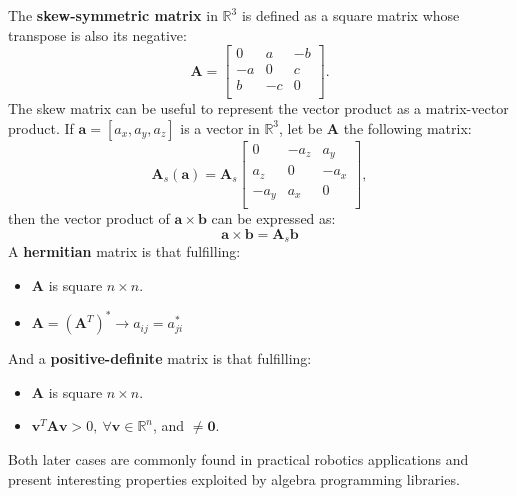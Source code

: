 The \textbf{skew-symmetric matrix} in $\mathbb{R}^3$ is defined as a square matrix whose transpose is also its negative:
\begin{equation}
\mathbf{A} = 
\left[
\begin{array}{ccc}
  0 & a & -b\\
  -a & 0 & c\\
  b & -c & 0\\
\end{array}
\right].
\end{equation}
The skew matrix can be useful to represent the vector product as a matrix-vector product. If $\mathbf{a}=[a_x,a_y,a_z]$ is a vector in $\mathbb{R}^3$, let be $\mathbf{A}$ the following matrix:
\begin{equation}
\mathbf{A}_s(\mathbf{a}) = \mathbf{A}_s 
\left[
\begin{array}{ccc}
  0 & -a_z & a_y\\
  a_z & 0 & -a_x\\
  -a_y & a_x & 0\\
\end{array}
\right], 
\end{equation}
then the vector product of $\mathbf{a}\times\mathbf{b}$ can be expressed as:
\begin{equation}
 \mathbf{a}\times\mathbf{b} = \mathbf{A}_s\mathbf{b} 
\end{equation}
A \textbf{hermitian} matrix is that fulfilling: 
\begin{itemize}
 \item $\mathbf{A}$ is square $n\times n$.
 \item $\mathbf{A} = (\mathbf{A}^T)^* \rightarrow a_{ij} = a_{ji}^*$
\end{itemize}
And a \textbf{positive-definite} matrix is that fulfilling: 
\begin{itemize}
 \item $\mathbf{A}$ is square $n\times n$.
 \item $\mathbf{v}^T\mathbf{A}\mathbf{v} > 0, \ \forall\mathbf{v}\in \mathbb{R}^n$, and $\neq \mathbf{0} $.
\end{itemize}
Both later cases are commonly found in practical robotics applications and present interesting properties exploited by algebra programming libraries.
